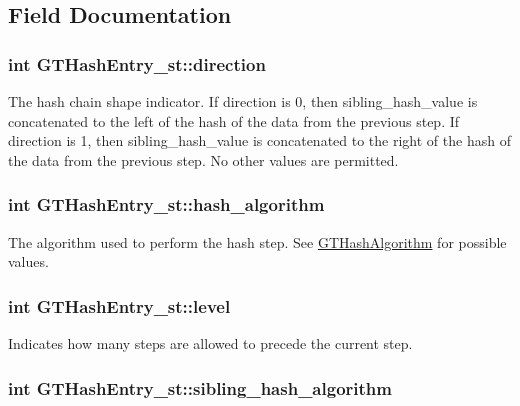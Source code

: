 \subsection{Field Documentation}
\hypertarget{struct_g_t_hash_entry__st_aa710126c9daa5e9686235104531a85ce}{
\subsubsection[{direction}]{\setlength{\rightskip}{0pt plus 5cm}int {\bf GTHashEntry\_\-st::direction}}}
\label{struct_g_t_hash_entry__st_aa710126c9daa5e9686235104531a85ce}
The hash chain shape indicator. If {\ttfamily direction} is 0, then {\ttfamily sibling\_\-hash\_\-value} is concatenated to the left of the hash of the data from the previous step. If {\ttfamily direction} is 1, then {\ttfamily sibling\_\-hash\_\-value} is concatenated to the right of the hash of the data from the previous step. No other values are permitted. \hypertarget{struct_g_t_hash_entry__st_a92fd2e8c617862d67872bf97ba554d92}{
\subsubsection[{hash\_\-algorithm}]{\setlength{\rightskip}{0pt plus 5cm}int {\bf GTHashEntry\_\-st::hash\_\-algorithm}}}
\label{struct_g_t_hash_entry__st_a92fd2e8c617862d67872bf97ba554d92}
The algorithm used to perform the hash step. See \hyperlink{group__common_ga5110e02245c37b4ff48ea4c4efb2924a}{GTHashAlgorithm} for possible values. \hypertarget{struct_g_t_hash_entry__st_a9c98ea68db1b4e2ce8112d708feccc69}{
\subsubsection[{level}]{\setlength{\rightskip}{0pt plus 5cm}int {\bf GTHashEntry\_\-st::level}}}
\label{struct_g_t_hash_entry__st_a9c98ea68db1b4e2ce8112d708feccc69}
Indicates how many steps are allowed to precede the current step. \hypertarget{struct_g_t_hash_entry__st_a3c427767bec4dcd42f94cdd31f15663f}{
\subsubsection[{sibling\_\-hash\_\-algorithm}]{\setlength{\rightskip}{0pt plus 5cm}int {\bf GTHashEntry\_\-st::sibling\_\-hash\_\-algorithm}}}
